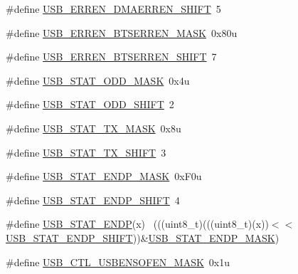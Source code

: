 \begin{DoxyCompactItemize}
\#define \hyperlink{group___u_s_b___register___masks_ga8b75afb2fa004a75b39023e38db4e784}{U\+S\+B\+\_\+\+E\+R\+R\+E\+N\+\_\+\+D\+M\+A\+E\+R\+R\+E\+N\+\_\+\+S\+H\+I\+FT}~5
\item 
\#define \hyperlink{group___u_s_b___register___masks_ga806a809f05df66a7669733c599646f7f}{U\+S\+B\+\_\+\+E\+R\+R\+E\+N\+\_\+\+B\+T\+S\+E\+R\+R\+E\+N\+\_\+\+M\+A\+SK}~0x80u
\item 
\#define \hyperlink{group___u_s_b___register___masks_ga5e760a100c4f43ecfd71952a5f393d77}{U\+S\+B\+\_\+\+E\+R\+R\+E\+N\+\_\+\+B\+T\+S\+E\+R\+R\+E\+N\+\_\+\+S\+H\+I\+FT}~7
\item 
\#define \hyperlink{group___u_s_b___register___masks_ga49caa3c5b36fc89eadadd60cdf331643}{U\+S\+B\+\_\+\+S\+T\+A\+T\+\_\+\+O\+D\+D\+\_\+\+M\+A\+SK}~0x4u
\item 
\#define \hyperlink{group___u_s_b___register___masks_ga15f3e2fa671ea1a59e0b24a9697faf8a}{U\+S\+B\+\_\+\+S\+T\+A\+T\+\_\+\+O\+D\+D\+\_\+\+S\+H\+I\+FT}~2
\item 
\#define \hyperlink{group___u_s_b___register___masks_gab953f904ef3a2b838a922ebdf69cf140}{U\+S\+B\+\_\+\+S\+T\+A\+T\+\_\+\+T\+X\+\_\+\+M\+A\+SK}~0x8u
\item 
\#define \hyperlink{group___u_s_b___register___masks_ga5173e8423017932d90919ddb18f918bd}{U\+S\+B\+\_\+\+S\+T\+A\+T\+\_\+\+T\+X\+\_\+\+S\+H\+I\+FT}~3
\item 
\#define \hyperlink{group___u_s_b___register___masks_gad8a184e838de511e23aa32011fc9f0b6}{U\+S\+B\+\_\+\+S\+T\+A\+T\+\_\+\+E\+N\+D\+P\+\_\+\+M\+A\+SK}~0x\+F0u
\item 
\#define \hyperlink{group___u_s_b___register___masks_ga5d85a4b028002bc9ce0f1650111cd49a}{U\+S\+B\+\_\+\+S\+T\+A\+T\+\_\+\+E\+N\+D\+P\+\_\+\+S\+H\+I\+FT}~4
\item 
\#define \hyperlink{group___u_s_b___register___masks_gad3e8103c4490cdec9585e10998f3e4b2}{U\+S\+B\+\_\+\+S\+T\+A\+T\+\_\+\+E\+N\+DP}(x)                                              ~(((uint8\+\_\+t)(((uint8\+\_\+t)(x))$<$$<$\hyperlink{group___u_s_b___register___masks_ga5d85a4b028002bc9ce0f1650111cd49a}{U\+S\+B\+\_\+\+S\+T\+A\+T\+\_\+\+E\+N\+D\+P\+\_\+\+S\+H\+I\+FT}))\&\hyperlink{group___u_s_b___register___masks_gad8a184e838de511e23aa32011fc9f0b6}{U\+S\+B\+\_\+\+S\+T\+A\+T\+\_\+\+E\+N\+D\+P\+\_\+\+M\+A\+SK})
\item 
\#define \hyperlink{group___u_s_b___register___masks_gaa406be72ac0b31143d3a3bc357af334b}{U\+S\+B\+\_\+\+C\+T\+L\+\_\+\+U\+S\+B\+E\+N\+S\+O\+F\+E\+N\+\_\+\+M\+A\+SK}~0x1u
\item 
$$
\end{DoxyCompactItemize}
